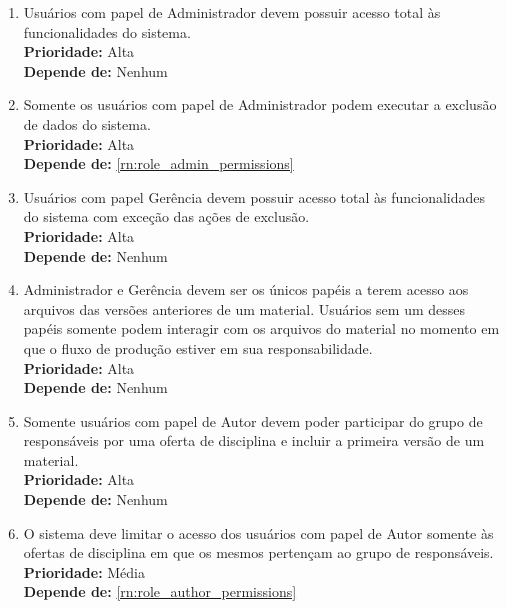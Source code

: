 \begin{enumerate}[label=\textbf{RN\protect\twodigits{\theenumi}}, leftmargin=2cm]
	
	\item \label{rn:role_admin_permissions} Usuários com papel de Administrador devem possuir acesso total às funcionalidades do sistema. \\
		\textbf{Prioridade:} Alta \\
		\textbf{Depende de:} Nenhum

	\item \label{rn:role_admin_exclusion_permissions} Somente os usuários com papel de Administrador podem executar a exclusão de dados do sistema. \\
		\textbf{Prioridade:} Alta \\
		\textbf{Depende de:} \hyperref[rn:role_admin_permissions]{\ref{rn:role_admin_permissions}}
	
	\item \label{rn:role_management_permissions} Usuários com papel Gerência devem possuir acesso total às funcionalidades do sistema com exceção das ações de exclusão. \\
		\textbf{Prioridade:} Alta \\
		\textbf{Depende de:} Nenhum

	\item \label{rn:material_files_visibility} Administrador e Gerência devem ser os únicos papéis a terem acesso aos arquivos das versões anteriores de um material. Usuários sem um desses papéis somente podem interagir com os arquivos do material no momento em que o fluxo de produção estiver em sua responsabilidade. \\
		\textbf{Prioridade:} Alta \\
		\textbf{Depende de:} Nenhum

	\item \label{rn:role_author_permissions} Somente usuários com papel de Autor devem poder participar do grupo de responsáveis por uma oferta de disciplina e incluir a primeira versão de um material. \\
		\textbf{Prioridade:} Alta \\
		\textbf{Depende de:} Nenhum

	\item \label{rn:role_author_permissions2} O sistema deve limitar o acesso dos usuários com papel de Autor somente às ofertas de disciplina em que os mesmos pertençam ao grupo de responsáveis. \\
		\textbf{Prioridade:} Média \\
		\textbf{Depende de:} \hyperref[rn:role_author_permissions]{\ref{rn:role_author_permissions}}


\end{enumerate}
